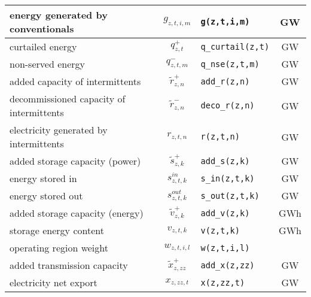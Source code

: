 \documentclass[11pt,a4paper]{article}
\begin{document}
\begin{longtable}{p{5.6cm} c l c}
energy generated by conventionals & $g_{z,t,i,m}$ & \texttt{g(z,t,i,m)} & GW \\ \hline
curtailed energy & $q^{+}_{z,t}$ & \texttt{q\_curtail(z,t)} & GW \\ \hline
non-served energy & $q^{-}_{z,t,m}$ & \texttt{q\_nse(z,t,m)} & GW \\ \hline
added capacity of intermittents & $\widetilde{r}^{+}_{z,n}$ & \texttt{add\_r(z,n)} & GW \\ \hline
decommissioned capacity of intermittents & $\widetilde{r}^{-}_{z,n}$ & \texttt{deco\_r(z,n)} & GW \\ \hline
electricity generated by intermittents & $r_{z,t,n}$ & \texttt{r(z,t,n)} & GW \\ \hline
added storage capacity (power) & $\widetilde{s}^{+}_{z,k}$ & \texttt{add\_s(z,k)} & GW \\ \hline
energy stored in & $s^{in}_{z,t,k}$ & \texttt{s\_in(z,t,k)} & GW \\ \hline
energy stored out & $s^{out}_{z,t,k}$ & \texttt{s\_out(z,t,k)} & GW \\ \hline
added storage capacity (energy) & $\widetilde{v}^{+}_{z,k}$ & \texttt{add\_v(z,k)} & GWh \\ \hline
storage energy content & $v_{z,t,k}$ & \texttt{v(z,t,k)} & GWh \\ \hline
operating region weight & $w_{z,t,i,l}$ & \texttt{w(z,t,i,l)} & \\ \hline
added transmission capacity & $\widetilde{x}^{+}_{z,zz}$ & \texttt{add\_x(z,zz)} & GW \\ \hline
electricity net export & $x_{z,zz,t}$ & \texttt{x(z,zz,t)} & GW \\ \hline \hline
\end{longtable}

\newpage
\end{document}

